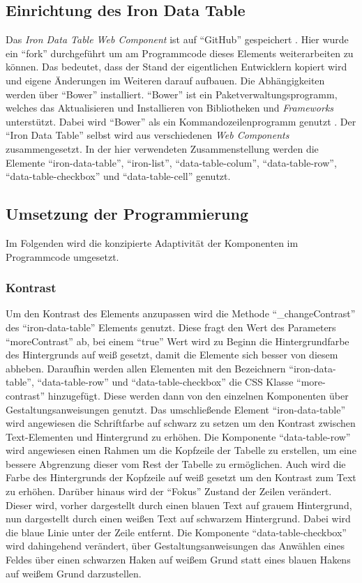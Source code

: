 \documentclass[12pt, paper=a4, bibtotoc, toc=listof, headsepline=true, numbers=endperiod]{scrreprt}
\begin{document}
	\subsection{Einrichtung des Iron Data Table}
	Das \emph{Iron Data Table Web Component} ist auf \enquote{GitHub} gespeichert \cite{saulis}. Hier wurde ein \enquote{fork} durchgeführt um am Programmcode dieses Elements weiterarbeiten zu können. Das bedeutet, dass der Stand der eigentlichen Entwicklern kopiert wird und eigene Änderungen im Weiteren darauf aufbauen. Die Abhängigkeiten werden über \enquote{Bower} installiert. \enquote{Bower} ist ein Paketverwaltungsprogramm, welches das Aktualisieren und Installieren von Bibliotheken und \emph{Frameworks} unterstützt. Dabei wird \enquote{Bower} als ein Kommandozeilenprogramm genutzt \cite{bower}. Der \enquote{Iron Data Table} selbst wird aus verschiedenen \emph{Web Components} zusammengesetzt. In der hier verwendeten Zusammenstellung werden die Elemente \enquote{iron-data-table}, \enquote{iron-list}, \enquote{data-table-colum}, \enquote{data-table-row}, \enquote{data-table-checkbox} und \enquote{data-table-cell}  genutzt.  
	\subsection{Umsetzung der Programmierung}
	Im Folgenden wird die konzipierte Adaptivität der Komponenten im Programmcode umgesetzt.
	\subsubsection{Kontrast}
	Um den Kontrast des Elements anzupassen wird die Methode \enquote{\_changeContrast} des \enquote{iron-data-table} Elements genutzt. Diese fragt den Wert des Parameters \enquote{moreContrast} ab, bei einem \enquote{true} Wert wird zu Beginn die Hintergrundfarbe des Hintergrunds auf weiß gesetzt, damit die Elemente sich besser von diesem abheben. Daraufhin werden allen Elementen mit den Bezeichnern \enquote{iron-data-table}, \enquote{data-table-row} und \enquote{data-table-checkbox} die CSS Klasse \enquote{more-contrast} hinzugefügt. Diese werden dann von den einzelnen Komponenten über Gestaltungsanweisungen genutzt. Das umschließende Element \enquote{iron-data-table} wird angewiesen die Schriftfarbe auf schwarz zu setzen um den Kontrast zwischen Text-Elementen und Hintergrund zu erhöhen. Die Komponente \enquote{data-table-row} wird angewiesen einen Rahmen um die Kopfzeile der Tabelle zu erstellen, um eine bessere Abgrenzung dieser vom Rest der Tabelle zu ermöglichen. Auch wird die Farbe des Hintergrunds der Kopfzeile auf weiß gesetzt um den Kontrast zum Text zu erhöhen. Darüber hinaus wird der \enquote{Fokus} Zustand der Zeilen verändert. Dieser wird, vorher dargestellt durch einen blauen Text auf grauem Hintergrund, nun dargestellt durch einen weißen Text auf schwarzem Hintergrund. Dabei wird die blaue Linie unter der Zeile entfernt. Die Komponente \enquote{data-table-checkbox} wird dahingehend verändert, über Gestaltungsanweisungen das Anwählen eines Feldes über einen schwarzen Haken auf weißem Grund statt eines blauen Hakens auf weißem Grund darzustellen.
\end{document}
